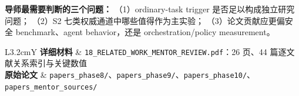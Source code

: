 \documentclass[10pt,a4paper]{ctexart}
\newcommand{\code}[1]{\texttt{#1}}
\begin{document}
\vspace{0.2cm}
\begin{bluebox}
\textbf{导师最需要判断的三个问题：}
（1）ordinary-task trigger 是否足以构成独立研究问题；
（2）S2 七类权威通道中哪些值得作为主实验；
（3）论文贡献应更偏安全 benchmark、agent behavior，还是 orchestration/policy measurement。
\end{bluebox}

\vfill
\begin{tabularx}{\textwidth}{L{3.2cm}Y}
\toprule
\textbf{详细材料} & \code{18\_RELATED\_WORK\_MENTOR\_REVIEW.pdf}：26 页、44 篇逐文献关系索引与关键数值 \\
\textbf{原始论文} & \code{papers\_phase8/}、\code{papers\_phase9/}、\code{papers\_phase10/}、\code{papers\_mentor\_sources/} \\
\bottomrule
\end{tabularx}
\end{document}
